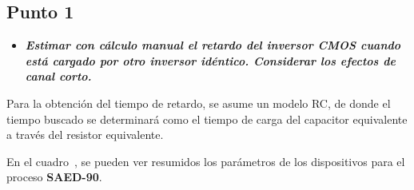 
\subsection{Punto \textbf{1}}

\begin{itemize}
\item \emph{\textbf{Estimar con cálculo manual el retardo del inversor \textbf{CMOS} cuando está cargado por otro inversor idéntico. Considerar los efectos de canal corto.}}
\end{itemize}


Para la obtención del tiempo de retardo, se asume un modelo RC, de donde el tiempo buscado se determinará como el tiempo de carga del capacitor equivalente a través del resistor equivalente.



En el cuadro~, se pueden ver resumidos los parámetros de los dispositivos para el proceso \textbf{SAED-90}.




